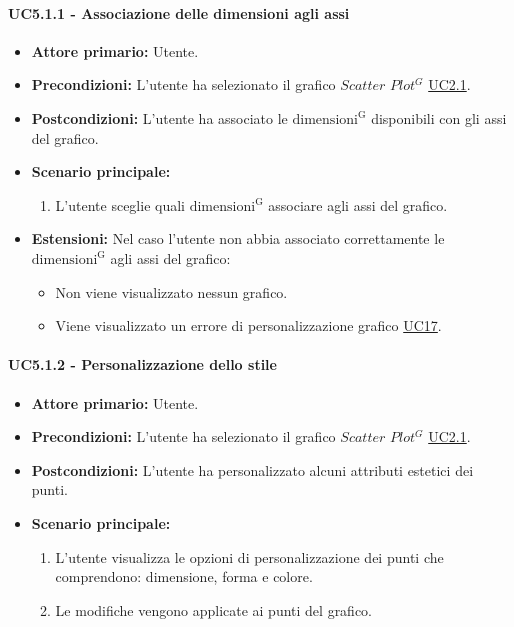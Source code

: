 \paragraph{UC5.1.1 - Associazione delle dimensioni agli assi}
\label{sec:UC5.1.1}
    \begin{itemize}
        \item \textbf{Attore primario:} Utente.
        \item \textbf{Precondizioni:} L'utente ha selezionato il grafico $Scatter$ $Plot^{G}$ \hyperref[sec:UC2.1]{UC2.1}.
	    \item \textbf{Postcondizioni:} L'utente ha associato le ${\mathrm{dimensioni^{G}}}$ disponibili con gli assi del grafico.
	    \item \textbf{Scenario principale:} 
	    \begin{enumerate}
	    		\item L'utente sceglie quali ${\mathrm{dimensioni^{G}}}$ associare agli assi del grafico.
		\end{enumerate}
	    \item \textbf{Estensioni:} Nel caso l'utente non abbia associato correttamente le ${\mathrm{dimensioni^{G}}}$ agli assi del grafico:
              \begin{itemize}
                  \item Non viene visualizzato nessun grafico.
                  \item Viene visualizzato un errore di personalizzazione grafico \hyperref[sec:UC17 - Errore di personalizzazione]{UC17}.
              \end{itemize}
    \end{itemize}
\paragraph{UC5.1.2 - Personalizzazione dello stile}
\label{sec:UC5.1.2}
    \begin{itemize}
        \item \textbf{Attore primario:} Utente.
        \item \textbf{Precondizioni:} L'utente ha selezionato il grafico $Scatter$ $Plot^{G}$ \hyperref[sec:UC2.1]{UC2.1}.
	    \item \textbf{Postcondizioni:} L'utente ha personalizzato alcuni attributi estetici dei punti.
	    \item \textbf{Scenario principale:} 
	    \begin{enumerate}
	    		\item L'utente visualizza le opzioni di personalizzazione dei punti che comprendono: dimensione, forma e colore.
	    		\item Le modifiche vengono applicate ai punti del grafico.
		\end{enumerate}
    \end{itemize}

